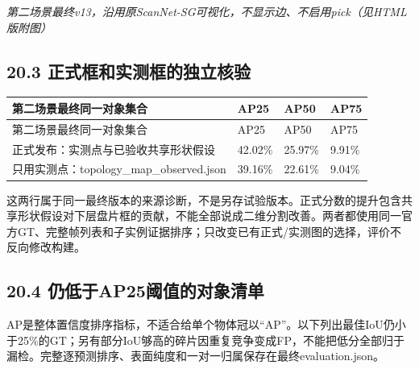 \documentclass[UTF8,fontset=fandol]{ctexart}
\begin{document}
\textit{第二场景最终v13，沿用原ScanNet-SG可视化，不显示边、不启用pick（见HTML版附图）}



\subsection*{20.3 正式框和实测框的独立核验}

{\small
\begin{longtable}{|p{}|p{}|p{}|p{}|}
\hline
第二场景最终同一对象集合 & AP25 & AP50 & AP75 \\ \hline
\endfirsthead
\hline
第二场景最终同一对象集合 & AP25 & AP50 & AP75 \\ \hline
\endhead
正式发布：实测点与已验收共享形状假设 & 42.02\% & 25.97\% & 9.91\% \\ \hline
只用实测点：topology\_map\_observed.json & 39.16\% & 22.61\% & 9.04\% \\ \hline
\end{longtable}
}

这两行属于同一最终版本的来源诊断，不是另存试验版本。正式分数的提升包含共享形状假设对下层盘片框的贡献，不能全部说成二维分割改善。两者都使用同一官方GT、完整帧列表和子实例证据排序；只改变已有正式/实测图的选择，评价不反向修改构建。



\subsection*{20.4 仍低于AP25阈值的对象清单}

AP是整体置信度排序指标，不适合给单个物体冠以“AP”。以下列出最佳IoU仍小于25\%的GT；另有部分IoU够高的碎片因重复竞争变成FP，不能把低分全部归于漏检。完整逐预测排序、表面纯度和一对一归属保存在最终evaluation.json。
\end{document}
